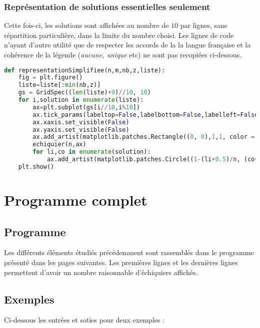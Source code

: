 \documentclass[a4paper]{article}
\begin{document}
\subsubsection{Représentation de solutions essentielles seulement}
Cette fois-ci, les solutions sont affichées au nombre de $10$ par lignes, sans répartition particulière, dans la limite du nombre choisi. Les lignes de code  n'ayant d'autre utilité que de respecter les accords de la la langue française et la cohérence de la légende (\textit{aucune, unique} etc) ne sont pas recopiées ci-dessous.
\begin{lstlisting}[language=Python,keywordstyle=\color{blue},stringstyle=\color{purple},commentstyle=\color{red},breaklines=true,extendedchars=true]
def representationSimplifiee(n,m,nb,z,liste):
    fig = plt.figure()
    liste=liste[:min(nb,z)]
    gs = GridSpec((len(liste)+9)//10, 10)
    for i,solution in enumerate(liste):
        ax=plt.subplot(gs[i//10,i%10])
        ax.tick_params(labeltop=False,labelbottom=False,labelleft=False,labelright=False)
        ax.xaxis.set_visible(False)
        ax.yaxis.set_visible(False)
        ax.add_artist(matplotlib.patches.Rectangle((0, 0),1,1, color = 'seashell',fill = True))
        echiquier(n,ax)
        for li,co in enumerate(solution):
            ax.add_artist(matplotlib.patches.Circle((1-(li+0.5)/n, (co+0.5)/n), 0.9/(2*n), color = 'red', fill=True))
    plt.show()
\end{lstlisting}

\section{Programme complet}

\subsection{Programme}
Les différents éléments étudiés précédemment sont rassemblés dans le programme présenté dans les pages suivantes. Les premières lignes et les dernières lignes permettent d'avoir un nombre raisonnable d'échiquiers affichés.

\subsection{Exemples}
Ci-dessous les entrées et soties pour deux exemples :
\begin{figure}[h!]
\centering
\end{figure}

\newpage
\end{document}
